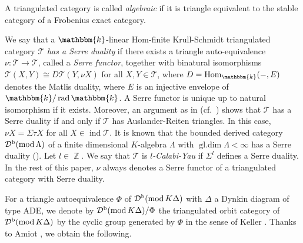 \documentclass[12pt]{amsart}
\numberwithin{equation}{subsection}
\theoremstyle{plain}
\theoremstyle{definition}
\newcommand{\Hom}{\operatorname{Hom}}
\newcommand{\rad}{\operatorname{rad}}
\renewcommand{\mod}{\mathrm{mod}\,}
\newcommand{\ind}{\operatorname{ind}}
\newcommand{\Z}{\operatorname{\mathbb{Z}}\nolimits}
\newcommand{\gldim}{\operatorname{gl.dim}}
\renewcommand{\L}{\Lambda}
\newcommand{\T}{\mathcal{T}}
\newcommand{\D}{\mathcal{D}}
\begin{document}
A triangulated category is called {\it algebraic} if it is triangle equivalent to the stable category of a Frobenius exact category.




We say that a $\mathbbm{k}$-linear Hom-finite Krull-Schmidt triangulated category $\T$ {\it has a Serre duality} if there exists a triangle auto-equivalence $\nu: \T \to \T$, called a {\it Serre functor}, together with binatural isomorphisms $\T(X, Y) \cong D\T(Y, \nu X)$ for all $X, Y\in \T$, where $D=\Hom_\mathbbm{k}(-, E)$ denotes the Matlis duality, where $E$ is an injective envelope of $\mathbbm{k}/\rad \mathbbm{k}$.
A Serre functor is unique up to natural isomorphism if it exists.
Moreover, an argument as in \cite[Section 3]{Iyama-Nakaoka-Palu_2024} (cf.~\cite[Section 6.3]{Krause_book}) shows that $\T$ has a Serre duality if and only if $\T$ has Auslander-Reiten triangles.
In this case, $\nu X = \Sigma \tau X$ for all $X\in\ind\T$.
It is known that the bounded derived category $\D^{\rm b}(\mod \L)$ of a finite dimensional $K$-algebra $\L$ with $\gldim\L<\infty$ has a Serre duality (\cite[3.4]{Happel_1991}).
Let $l\in\Z$.
We say that $\T$ is {\it $l$-Calabi-Yau} \cite{Keller_2005} if $\Sigma^l$ defines a Serre duality.
In the rest of this paper, $\nu$  always denotes a Serre functor of a triangulated category with Serre duality.





For a triangle autoequivalence $\Phi$ of $\D^{\rm b}(\mod K\Delta)$
with $\Delta$ a Dynkin diagram of type ADE, we denote by 
$\D^{\rm b}(\mod K\Delta)/\Phi$ the triangulated orbit category of $\D^{\rm b}(\mod K\Delta)$ by the cyclic group generated by $\Phi$ in the sense of Keller \cite{Keller_2005}.
Thanks to Amiot \cite{Amiot_2007}, we obtain the following. 
\end{document}
